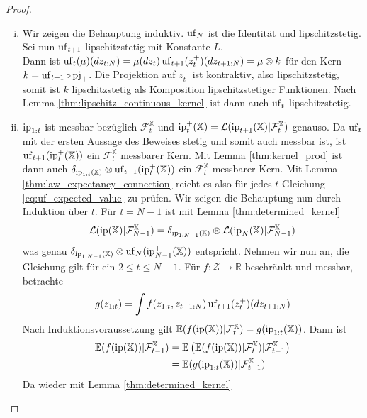 \begin{proof}
\begin{enumerate}[(i)]
    \item Wir zeigen die Behauptung induktiv. $\operatorname{uf}_N$ ist die Identität und lipschitzstetig. Sei nun $\operatorname{uf}_{t+1}$ lipschitzstetig mit Konstante $L$. \\
     Dann ist $\operatorname{uf}_t(\mu)(dz_{t:N}) = \mu(dz_t)\operatorname{uf}_{t+1}(z_t^+)(dz_{t+1:N}) = \mu \otimes k$ für den Kern $k = \operatorname{uf}_{t+1} \circ \operatorname{pj}_+$. Die Projektion auf $z_t^+$ ist kontraktiv, also lipschitzstetig, somit ist $k$ lipschitzstetig als Komposition lipschitzstetiger Funktionen. Nach Lemma \ref{thm:lipschitz_continuous_kernel} ist dann auch $\operatorname{uf}_t$ lipschitzstetig.

    \item $\operatorname{ip}_{1:t}$ ist messbar bezüglich $\mathcal{F}_t^\mathbb{X}$ und $\operatorname{ip}_t^+(\mathbb{X})=\mathcal{L}(\operatorname{ip}_{t+1}(\mathbb{X})\vert \mathcal{F}_t^\mathbb{X})$ genauso. Da $\operatorname{uf}_t$ mit der ersten Aussage des Beweises stetig und somit auch messbar ist, ist $\operatorname{uf}_{t+1}(\operatorname{ip}_t^+(\mathbb{X}))$ ein $\mathcal{F}_t^\mathbb{X}$ messbarer Kern. Mit Lemma \ref{thm:kernel_prod} ist dann auch $\delta_{\operatorname{ip}_{1:t}(\mathbb{X})}\otimes \operatorname{uf}_{t+1}(\operatorname{ip}_t^+(\mathbb{X}))$ ein $\mathcal{F}_t^\mathbb{X}$ messbarer Kern. Mit Lemma \ref{thm:law_expectancy_connection} reicht es also für jedes $t$ Gleichung \ref{eq:uf_expected_value} zu prüfen. Wir zeigen die Behauptung nun durch Induktion über $t$. Für $t=N-1$ ist mit Lemma \ref{thm:determined_kernel} 
    $$\mathcal{L}(\operatorname{ip}(\mathbb{X})\vert \mathcal{F}_{N-1}^\mathbb{X})=\delta_{\operatorname{ip}_{1:N-1}(\mathbb{X})} \otimes \mathcal{L}(\operatorname{ip}_N(\mathbb{X})\vert \mathcal{F}_{N-1}^\mathbb{X})$$
    was genau $\delta_{\operatorname{ip}_{1:N-1}(\mathbb{X})}\otimes \operatorname{uf}_{N}(\operatorname{ip}_{N-1}^+(\mathbb{X}))$ entspricht. Nehmen wir nun an, die Gleichung gilt für ein $2\leq t\leq N-1$. Für $f: \mathcal{Z}\rightarrow\mathbb{R}$ beschränkt und messbar, betrachte
    $$g(z_{1:t})=\int f(z_{1:t}, z_{t+1:N})\operatorname{uf}_{t+1}(z_t^+)(dz_{t+1:N})$$
    Nach Induktionsvoraussetzung gilt $\mathbb{E}(f(\operatorname{ip}(\mathbb{X}))\vert\mathcal{F}_t^\mathbb{X})=g(\operatorname{ip}_{1:t}(\mathbb{X}))$.
    Dann ist 
    \begin{align*}
    \mathbb{E}(f(\operatorname{ip}(\mathbb{X}))\vert\mathcal{F}_{t-1}^\mathbb{X}) &= \mathbb{E}\left( \mathbb{E}(f(\operatorname{ip}(\mathbb{X}))\vert \mathcal{F}_{t}^\mathbb{X}) \vert \mathcal{F}_{t-1}^\mathbb{X}\right) \\
    &= \mathbb{E}(g(\operatorname{ip}_{1:t}(\mathbb{X}))\vert \mathcal{F}_{t-1}^\mathbb{X})
    \end{align*}
    Da wieder mit Lemma \ref{thm:determined_kernel} 

\end{enumerate}
\end{proof}

